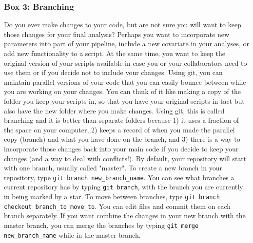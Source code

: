 \subsubsection{Box 3: Branching}

Do you ever make changes to your code, but are not sure you will want to keep those changes for your final analysis? Perhaps you want to incorporate new parameters into part of your pipeline, include a new covariate in your analyses, or add new functionality to a script. At the same time, you want to keep the original version of your scripts available in case you or your collaborators need to use them or if you decide not to include your changes. Using git, you can maintain parallel versions of your code that you can easily bounce between while you are working on your changes. You can think of it like making a copy of the folder you keep your scripts in, so that you have your original scripts in tact but also have the new folder where you make changes. Using git, this is called branching and it is better than separate folders because 1) it uses a fraction of the space on your computer, 2) keeps a record of when you made the parallel copy (branch) and what you have done on the branch, and 3) there is a way to incorporate those changes back into your main code if you decide to keep your changes (and a way to deal with conflicts!). By default, your repository will start with one branch, usually called "master". To create a new branch in your repository, type \verb|git branch new_branch_name|. You can see what branches a current repository has by typing \verb|git branch|, with the branch you are currently in being marked by a star. To move between branches, type \verb|git branch checkout branch_to_move_to|. You can edit files and commit them on each branch separately. If you want combine the changes in your new branch with the master branch, you can merge the branches by typing \verb|git merge new_branch_name| while in the master branch. 